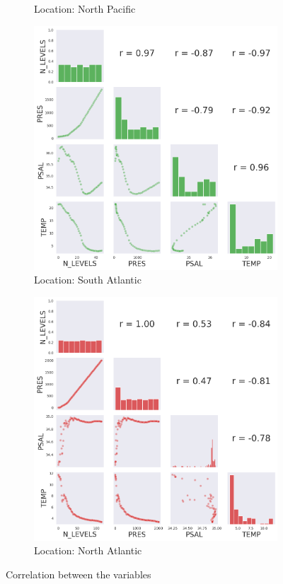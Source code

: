 \documentclass[12pt]{article}
\begin{document}
\begin{figure}[H]
\begin{subfigure}{.5\textwidth}
        \caption{Location: North Pacific}
        \end{subfigure}
        \begin{subfigure}{.5\textwidth}
            \centering
            \includegraphics[width=1\textwidth]{correlation3.png}
        \caption{Location: South Atlantic}
        \end{subfigure}%
        \begin{subfigure}{.5\textwidth}
            \centering
            \includegraphics[width=1\textwidth]{correlation4.png}
        \caption{Location: North Atlantic}
        \end{subfigure}%
        \caption[short]{Correlation between the variables}
        \label{corr}
        \end{figure}
    
\end{document}
